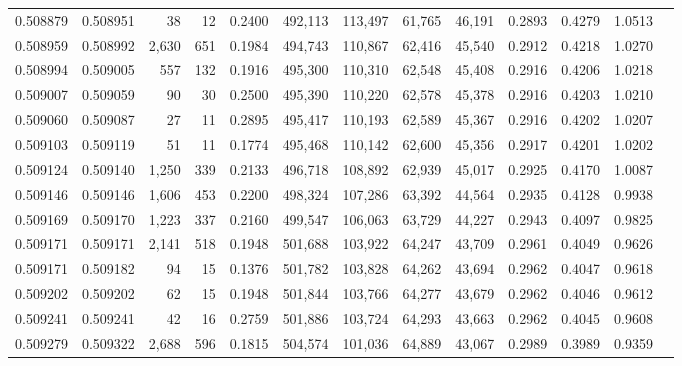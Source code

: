 \begin{tabular}{rrrrrrrrrrrrr}
0.508879 & 0.508951 &    38 &    12 &                                     0.2400 & 492,113 & 113,497 &  61,765 &  46,191 & 0.2893 & 0.4279 & 1.0513 \\
0.508959 & 0.508992 & 2,630 &   651 &                                     0.1984 & 494,743 & 110,867 &  62,416 &  45,540 & 0.2912 & 0.4218 & 1.0270 \\
0.508994 & 0.509005 &   557 &   132 &                                     0.1916 & 495,300 & 110,310 &  62,548 &  45,408 & 0.2916 & 0.4206 & 1.0218 \\
0.509007 & 0.509059 &    90 &    30 &                                     0.2500 & 495,390 & 110,220 &  62,578 &  45,378 & 0.2916 & 0.4203 & 1.0210 \\
0.509060 & 0.509087 &    27 &    11 &                                     0.2895 & 495,417 & 110,193 &  62,589 &  45,367 & 0.2916 & 0.4202 & 1.0207 \\
0.509103 & 0.509119 &    51 &    11 &                                     0.1774 & 495,468 & 110,142 &  62,600 &  45,356 & 0.2917 & 0.4201 & 1.0202 \\
0.509124 & 0.509140 & 1,250 &   339 &                                     0.2133 & 496,718 & 108,892 &  62,939 &  45,017 & 0.2925 & 0.4170 & 1.0087 \\
0.509146 & 0.509146 & 1,606 &   453 &                                     0.2200 & 498,324 & 107,286 &  63,392 &  44,564 & 0.2935 & 0.4128 & 0.9938 \\
0.509169 & 0.509170 & 1,223 &   337 &                                     0.2160 & 499,547 & 106,063 &  63,729 &  44,227 & 0.2943 & 0.4097 & 0.9825 \\
0.509171 & 0.509171 & 2,141 &   518 &                                     0.1948 & 501,688 & 103,922 &  64,247 &  43,709 & 0.2961 & 0.4049 & 0.9626 \\
0.509171 & 0.509182 &    94 &    15 &                                     0.1376 & 501,782 & 103,828 &  64,262 &  43,694 & 0.2962 & 0.4047 & 0.9618 \\
0.509202 & 0.509202 &    62 &    15 &                                     0.1948 & 501,844 & 103,766 &  64,277 &  43,679 & 0.2962 & 0.4046 & 0.9612 \\
0.509241 & 0.509241 &    42 &    16 &                                     0.2759 & 501,886 & 103,724 &  64,293 &  43,663 & 0.2962 & 0.4045 & 0.9608 \\
0.509279 & 0.509322 & 2,688 &   596 &                                     0.1815 & 504,574 & 101,036 &  64,889 &  43,067 & 0.2989 & 0.3989 & 0.9359 \\

\end{tabular}
